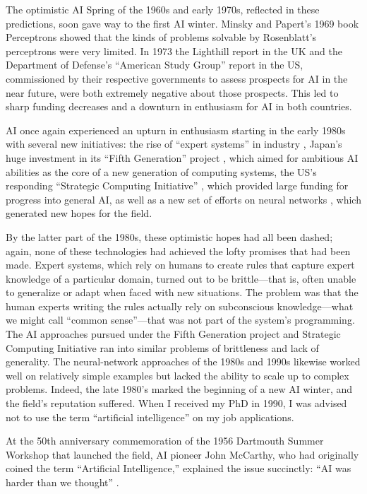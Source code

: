 \documentclass{article}
\begin{document}
The optimistic AI Spring of the 1960s and early 1970s, reflected in these predictions, soon gave way to the first AI winter.  Minsky and Papert's 1969 book Perceptrons \cite{Minsky1969} showed that the kinds of problems solvable by Rosenblatt's perceptrons were very limited. In 1973 the Lighthill report \cite{Lighthill1973} in the UK and the Department of Defense's ``American Study Group'' report in the US, commissioned by their respective governments to assess prospects for AI in the near future, were both extremely negative about those prospects. This led to sharp funding decreases and a downturn in enthusiasm for AI in both countries.

AI once again experienced an upturn in enthusiasm starting in the early 1980s with several new initiatives: the rise of ``expert systems'' in industry \cite{Durkin1996},  Japan's huge investment in its ``Fifth Generation'' project \cite{Gaines1984}, which aimed for ambitious AI abilities as the core of a new generation of computing systems, the US's responding ``Strategic Computing Initiative'' \cite{Stefik1985}, which provided large funding for progress into general AI, as well as a new set of efforts on neural networks \cite{McClelland1986a,McClelland1986b}, which generated new hopes for the field.

By the latter part of the 1980s, these optimistic hopes had all been dashed; again, none of these technologies had achieved the lofty promises that had been made.  Expert systems, which rely on humans to create rules that capture expert knowledge of a particular domain, turned out to be brittle---that is, often unable to generalize or adapt when faced with new situations.  The problem was that the human experts writing the rules actually rely on subconscious knowledge---what we might call ``common sense''---that was not part of the system's programming.  The AI approaches pursued under the Fifth Generation project and Strategic Computing Initiative ran into similar problems of brittleness and lack of generality.  The neural-network approaches of the 1980s and 1990s likewise worked well on relatively simple examples but lacked the ability to scale up to complex problems. Indeed, the late 1980's marked the beginning of a new AI winter, and the field's reputation suffered.  When I received my PhD in 1990, I was advised not to use the term ``artificial intelligence'' on my job applications.

At the 50th anniversary commemoration of the 1956 Dartmouth Summer Workshop that launched the field, AI pioneer John McCarthy, who had originally coined the term ``Artificial Intelligence,'' explained the issue succinctly: ``AI was harder than we thought'' \cite{Moewes2013}.
\end{document}

